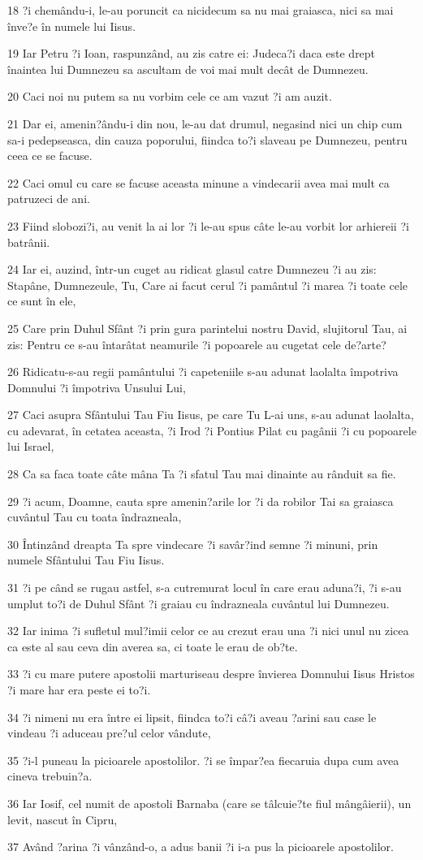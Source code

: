 \par 18 ?i chemându-i, le-au poruncit ca nicidecum sa nu mai graiasca, nici sa mai înve?e în numele lui Iisus.
\par 19 Iar Petru ?i Ioan, raspunzând, au zis catre ei: Judeca?i daca este drept înaintea lui Dumnezeu sa ascultam de voi mai mult decât de Dumnezeu.
\par 20 Caci noi nu putem sa nu vorbim cele ce am vazut ?i am auzit.
\par 21 Dar ei, amenin?ându-i din nou, le-au dat drumul, negasind nici un chip cum sa-i pedepseasca, din cauza poporului, fiindca to?i slaveau pe Dumnezeu, pentru ceea ce se facuse.
\par 22 Caci omul cu care se facuse aceasta minune a vindecarii avea mai mult ca patruzeci de ani.
\par 23 Fiind slobozi?i, au venit la ai lor ?i le-au spus câte le-au vorbit lor arhiereii ?i batrânii.
\par 24 Iar ei, auzind, într-un cuget au ridicat glasul catre Dumnezeu ?i au zis: Stapâne, Dumnezeule, Tu, Care ai facut cerul ?i pamântul ?i marea ?i toate cele ce sunt în ele,
\par 25 Care prin Duhul Sfânt ?i prin gura parintelui nostru David, slujitorul Tau, ai zis: Pentru ce s-au întarâtat neamurile ?i popoarele au cugetat cele de?arte?
\par 26 Ridicatu-s-au regii pamântului ?i capeteniile s-au adunat laolalta împotriva Domnului ?i împotriva Unsului Lui,
\par 27 Caci asupra Sfântului Tau Fiu Iisus, pe care Tu L-ai uns, s-au adunat laolalta, cu adevarat, în cetatea aceasta, ?i Irod ?i Pontius Pilat cu pagânii ?i cu popoarele lui Israel,
\par 28 Ca sa faca toate câte mâna Ta ?i sfatul Tau mai dinainte au rânduit sa fie.
\par 29 ?i acum, Doamne, cauta spre amenin?arile lor ?i da robilor Tai sa graiasca cuvântul Tau cu toata îndrazneala,
\par 30 Întinzând dreapta Ta spre vindecare ?i savâr?ind semne ?i minuni, prin numele Sfântului Tau Fiu Iisus.
\par 31 ?i pe când se rugau astfel, s-a cutremurat locul în care erau aduna?i, ?i s-au umplut to?i de Duhul Sfânt ?i graiau cu îndrazneala cuvântul lui Dumnezeu.
\par 32 Iar inima ?i sufletul mul?imii celor ce au crezut erau una ?i nici unul nu zicea ca este al sau ceva din averea sa, ci toate le erau de ob?te.
\par 33 ?i cu mare putere apostolii marturiseau despre învierea Domnului Iisus Hristos ?i mare har era peste ei to?i.
\par 34 ?i nimeni nu era între ei lipsit, fiindca to?i câ?i aveau ?arini sau case le vindeau ?i aduceau pre?ul celor vândute,
\par 35 ?i-l puneau la picioarele apostolilor. ?i se împar?ea fiecaruia dupa cum avea cineva trebuin?a.
\par 36 Iar Iosif, cel numit de apostoli Barnaba (care se tâlcuie?te fiul mângâierii), un levit, nascut în Cipru,
\par 37 Având ?arina ?i vânzând-o, a adus banii ?i i-a pus la picioarele apostolilor.

